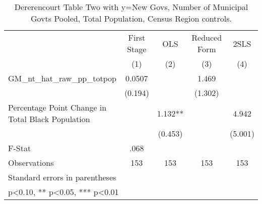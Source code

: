 \begin{table}[htbp]\centering
\def\sym#1{\ifmmode^{#1}\else\(^{#1}\)\fi}
\caption{Dererencourt Table Two with y=New Govs, Number of Municipal Govts  Pooled, Total Population, Census Region controls.}
\begin{tabular}{l*{4}{c}}
\toprule
                    & First Stage   &         OLS   &Reduced Form   &        2SLS   \\
                    &\multicolumn{1}{c}{(1)}   &\multicolumn{1}{c}{(2)}   &\multicolumn{1}{c}{(3)}   &\multicolumn{1}{c}{(4)}   \\
\midrule
GM\_nt\_hat\_raw\_pp\_totpop&      0.0507   &               &       1.469   &               \\
                    &     (0.194)   &               &     (1.302)   &               \\
\addlinespace
Percentage Point Change in Total Black Population&               &       1.132** &               &       4.942   \\
                    &               &     (0.453)   &               &     (5.001)   \\
\midrule
F-Stat              &        .068   &               &               &               \\
Observations        &         153   &         153   &         153   &         153   \\
\bottomrule
\multicolumn{5}{l}{\footnotesize Standard errors in parentheses}\\
\multicolumn{5}{l}{\footnotesize * p<0.10, ** p<0.05, *** p<0.01}\\
\end{tabular}
\end{table}
